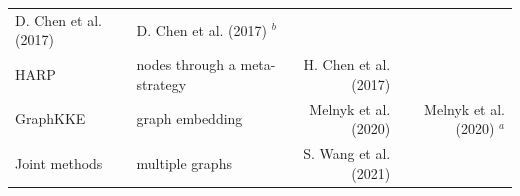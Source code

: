 \documentclass[11pt]{article}
\begin{document}
\begin{longtable}[]{@{}llrr@{}}
\begin{minipage}[t]{0.16\columnwidth}
D. Chen et al. (2017)\strut
\end{minipage} & \begin{minipage}[t]{0.32\columnwidth}\raggedleft
D. Chen et al. (2017) \(^b\)\strut
\end{minipage}\tabularnewline
\begin{minipage}[t]{0.11\columnwidth}\raggedright
HARP\strut
\end{minipage} & \begin{minipage}[t]{0.30\columnwidth}\raggedright
nodes through a meta-strategy\strut
\end{minipage} & \begin{minipage}[t]{0.16\columnwidth}\raggedleft
H. Chen et al. (2017)\strut
\end{minipage} & \begin{minipage}[t]{0.32\columnwidth}\raggedleft
\strut
\end{minipage}\tabularnewline
\begin{minipage}[t]{0.11\columnwidth}\raggedright
GraphKKE\strut
\end{minipage} & \begin{minipage}[t]{0.30\columnwidth}\raggedright
graph embedding\strut
\end{minipage} & \begin{minipage}[t]{0.16\columnwidth}\raggedleft
Melnyk et al. (2020)\strut
\end{minipage} & \begin{minipage}[t]{0.32\columnwidth}\raggedleft
Melnyk et al. (2020) \(^a\)\strut
\end{minipage}\tabularnewline
\begin{minipage}[t]{0.11\columnwidth}\raggedright
Joint methods\strut
\end{minipage} & \begin{minipage}[t]{0.30\columnwidth}\raggedright
multiple graphs\strut
\end{minipage} & \begin{minipage}[t]{0.16\columnwidth}\raggedleft
S. Wang et al. (2021)\strut
\end{minipage} & \begin{minipage}[t]{0.32\columnwidth}\raggedleft
\strut
\end{minipage}\tabularnewline
\bottomrule
\end{longtable}
\end{document}
